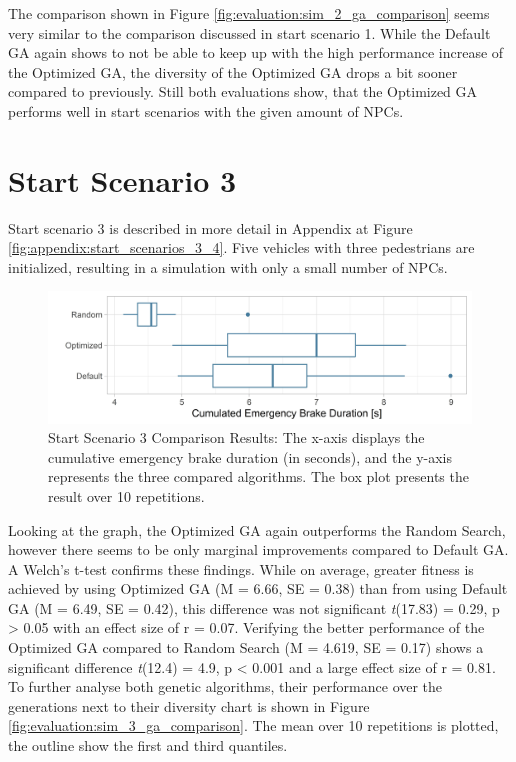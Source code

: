 The comparison shown in Figure \ref{fig:evaluation:sim_2_ga_comparison} seems very similar to the comparison discussed in start scenario 1. While the Default GA again shows to not be able to keep up with the high performance increase of the Optimized GA, the diversity of the Optimized GA drops a bit sooner compared to previously. Still both evaluations show, that the Optimized GA performs well in start scenarios with the given amount of NPCs.

\section{Start Scenario 3}
\label{sect:evaluation:scenario_3}
Start scenario 3 is described in more detail in Appendix at Figure \ref{fig:appendix:start_scenarios_3_4}. Five vehicles with three pedestrians are initialized, resulting in a simulation with only a small number of NPCs.

\begin{figure}[ht] 
	\includegraphics[width=1\linewidth]{simulations/evaluation/plots/sim_3_comparison}
	\caption{Start Scenario 3 Comparison Results: The x-axis displays the cumulative emergency brake duration (in seconds), and the y-axis represents the three compared algorithms. The box plot presents the result over 10 repetitions.}
	\label{fig:evaluation:sim_3_comparison}
\end{figure}

Looking at the graph, the Optimized GA again outperforms the Random Search, however there seems to be only marginal improvements compared to Default GA. A Welch's t-test confirms these findings. While on average, greater fitness is achieved by using Optimized GA (M = 6.66, SE = 0.38) than from using Default GA (M = 6.49, SE = 0.42), this difference was not significant \textit{t}(17.83) = 0.29, p > 0.05 with an effect size of r = 0.07. Verifying the better performance of the Optimized GA compared to Random Search (M = 4.619, SE = 0.17) shows a significant difference \textit{t}(12.4) = 4.9, p < 0.001 and a large effect size of r = 0.81. To further analyse both genetic algorithms, their performance over the generations next to their diversity chart is shown in Figure \ref{fig:evaluation:sim_3_ga_comparison}. The mean over 10 repetitions is plotted, the outline show the first and third quantiles.


